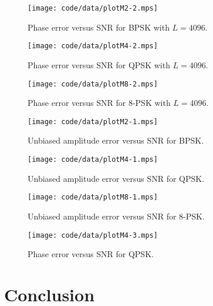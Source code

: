 \documentclass[journal]{IEEEtran}
\begin{document}
\begin{figure}[p]
	\centering
		\texttt{[image: code/data/plotM2-2.mps]}
		\caption{Phase error versus SNR for BPSK with $L=4096$.}
		\label{fig:plotphaseBPSK}
\end{figure}

\begin{figure}[p]
	\centering
		\texttt{[image: code/data/plotM4-2.mps]}
		\caption{Phase error versus SNR for QPSK with $L=4096$.}
		\label{fig:plotphaseQPSK}
\end{figure}

\begin{figure}[p]
	\centering
		\texttt{[image: code/data/plotM8-2.mps]}
		\caption{Phase error versus SNR for $8$-PSK with $L=4096$.}
		\label{fig:plotphase8PSK}
\end{figure}



\begin{figure}[p]
	\centering
		\texttt{[image: code/data/plotM2-1.mps]}
		\caption{Unbiased amplitude error versus SNR for BPSK.}
		\label{fig:plotampBPSK}
\end{figure}

\begin{figure}[p]
	\centering
		\texttt{[image: code/data/plotM4-1.mps]}
		\caption{Unbiased amplitude error versus SNR for QPSK.}
		\label{fig:plotampQPSK}
\end{figure}

\begin{figure}[p]
	\centering
		\texttt{[image: code/data/plotM8-1.mps]}
		\caption{Unbiased amplitude error versus SNR for $8$-PSK.}
		\label{fig:plotamp8PSK}
\end{figure}


\begin{figure}[tp]
	\centering
		\texttt{[image: code/data/plotM4-3.mps]}
		\caption{Phase error versus SNR for QPSK.}
		\label{fig:plotphaseQPSKmultL}
\end{figure}


\section{Conclusion}
\end{document}
